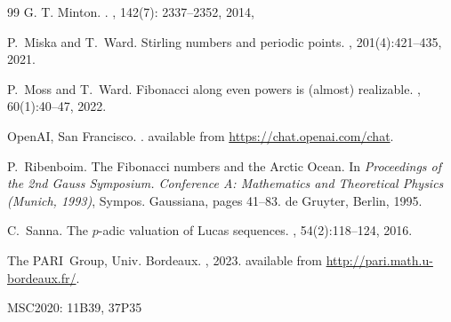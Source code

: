 \documentclass[]{interact}
\theoremstyle{plain}
\numberwithin{equation}{section} %
\numberwithin{table}{section} %
\numberwithin{figure}{section}
\begin{document}
\begin{thebibliography}{99}
G. T. Minton.
.
, {142}(7): 2337--2352, 2014,

P.~Miska and T.~Ward.
\newblock Stirling numbers and periodic points.
, 201(4):421--435, 2021.

P.~Moss and T.~Ward.
\newblock Fibonacci along even powers is (almost) realizable.
, 60(1):40--47, 2022.

OpenAI, San Francisco.
.
\newblock available from \url{https://chat.openai.com/chat}.

P.~Ribenboim.
\newblock The {F}ibonacci numbers and the {A}rctic {O}cean.
\newblock In {\em Proceedings of the 2nd {G}auss {S}ymposium. {C}onference {A}:
  {M}athematics and {T}heoretical {P}hysics ({M}unich, 1993)}, Sympos.
  Gaussiana, pages 41--83. de Gruyter, Berlin, 1995.

C.~Sanna.
\newblock The {$p$}-adic valuation of {L}ucas sequences.
, 54(2):118--124, 2016.

{The PARI~Group}, Univ. Bordeaux.
, 2023.
\newblock available from \url{http://pari.math.u-bordeaux.fr/}.

\end{thebibliography}


\noindent MSC2020: 11B39, 37P35

\end{document}
